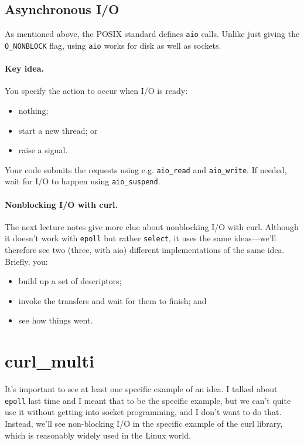 \documentclass[11pt]{article}
\begin{document}
\subsection*{Asynchronous I/O}
As mentioned above, the POSIX standard defines {\tt aio} calls.
Unlike just giving the {\tt O\_NONBLOCK} flag, using {\tt aio} works
for disk as well as sockets.

\paragraph{Key idea.} You specify the action to occur when I/O is ready:
    \begin{itemize}
      \item nothing;
      \item start a new thread; or
      \item raise a signal.
    \end{itemize}

Your code submits the requests using e.g. {\tt aio\_read} and {\tt aio\_write}.
If needed, wait for I/O to happen using {\tt aio\_suspend}.

\paragraph{Nonblocking I/O with curl.} The next lecture notes give more clue
about nonblocking I/O with curl. Although it doesn't work with {\tt epoll}
but rather {\tt select}, it uses the same ideas---we'll therefore see two
(three, with aio) different implementations of the same idea. 
Briefly, you:
\begin{itemize}
\item build up a set of descriptors;
\item invoke the transfers and wait for them to finish; and
\item see how things went.
\end{itemize}

\section*{curl\_multi}
It's important to see at least one specific example of an idea. I talked about
{\tt epoll} last time and I meant that to be the specific example, but we 
can't quite use it without getting into socket programming, and I don't want to
do that. Instead, we'll see non-blocking I/O in the specific example of the curl
library, which is reasonably widely used in the Linux world.
\end{document}
